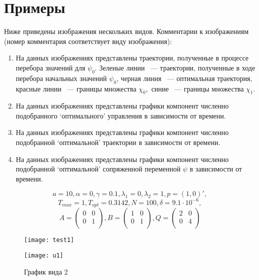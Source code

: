 \documentclass[11pt]{article}
\begin{document}
\section{Примеры}
Ниже приведены изображения нескольких видов. Комментарии к изображениям (номер комментария соответствует виду изображения):
\begin{enumerate}
\item На данных изображениях представлены траектории, полученные в процессе перебора значений для $\psi_0.$
Зеленые линии ~--- траектории, полученные в ходе перебора начальных значений $\psi_0$, 
черная линия ~--- оптимальная траектория, красные линии ~--- границы множества $\chi_0,$ 
синие ~--- границы множества $\chi_1.$
\item На данных изображениях представлены графики компонент численно подобранного ‘оптимального’ управления
в зависимости от времени.
\item На данных изображениях представлены графики компонент численно подобранной ‘оптимальной’ траектории
в зависимости от времени.
\item На данных изображениях представлены графики компонент численно подобранной ‘оптимальной’ сопряженной
переменной $\psi$ в зависимости от времени.
\end{enumerate}

\newpage
\[a = 10, \alpha = 0, \gamma = 0.1, \lambda_1 = 0, \lambda_2 = 1, p = (1,0)',\] 
\[T_{max} = 1, T_{opt} = 0.3142, N = 100, \delta = 9.1\cdot 10^{-6},\]
\[
A = \left(
\begin{array}{cc}
0 & 0\\
0 & 1\\
\end{array}
\right),
B = \left(
\begin{array}{cc}
1 & 0\\
0 & 1\\
\end{array}
\right),
Q = \left(
\begin{array}{cc}
2 & 0\\
0 & 4\\
\end{array}
\right)
\]

\begin{figure}[h!]
%
{\texttt{[image: test1]}}
\end{figure}

\begin{figure}\caption{График вида 2}
\centering
\texttt{[image: u1]}
\end{figure}
\end{document}
